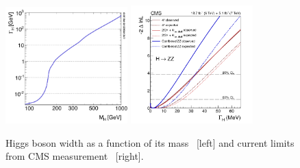 \begin{figure}[!Hhtbp]
  \begin{center}
    \includegraphics[width=0.42\textwidth]{figs/u0g5o.png}
    \includegraphics[width=0.42\textwidth]{figs/AllFitPaper_30_04_14_MeV.png}
    \caption{Higgs boson width as a function of its mass~\cite{Dittmaier:2011ti, Dittmaier:2012vm, Heinemeyer:2013tqa, HIGGSXSWG} [left] and current limits from CMS measurement~\cite{Khachatryan:2014iha} [right].}
    \label{fig:WidthHiggs}
  \end{center}
\end{figure}




